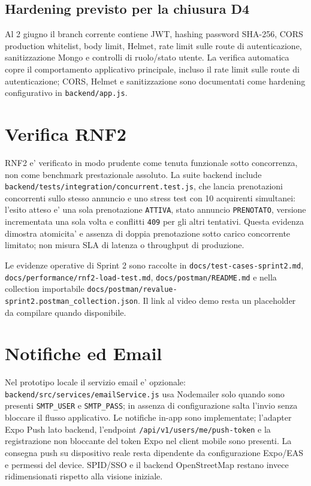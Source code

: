 \documentclass[11pt,a4paper]{article}
\begin{document}
\subsection*{Hardening previsto per la chiusura D4}

Al 2 giugno il branch corrente contiene JWT, hashing password SHA-256, CORS production whitelist, body limit, Helmet, rate limit sulle route di autenticazione, sanitizzazione Mongo e controlli di ruolo/stato utente. La verifica automatica copre il comportamento applicativo principale, incluso il rate limit sulle route di autenticazione; CORS, Helmet e sanitizzazione sono documentati come hardening configurativo in \texttt{backend/app.js}.

\section{Verifica RNF2}

RNF2 e' verificato in modo prudente come tenuta funzionale sotto concorrenza, non come benchmark prestazionale assoluto. La suite backend include \texttt{backend/tests/integration/concurrent.test.js}, che lancia prenotazioni concorrenti sullo stesso annuncio e uno stress test con 10 acquirenti simultanei: l'esito atteso e' una sola prenotazione \texttt{ATTIVA}, stato annuncio \texttt{PRENOTATO}, versione incrementata una sola volta e conflitti \texttt{409} per gli altri tentativi. Questa evidenza dimostra atomicita' e assenza di doppia prenotazione sotto carico concorrente limitato; non misura SLA di latenza o throughput di produzione.

Le evidenze operative di Sprint 2 sono raccolte in \texttt{docs/test-cases-sprint2.md}, \texttt{docs/performance/rnf2-load-test.md}, \texttt{docs/postman/README.md} e nella collection importabile \texttt{docs/postman/revalue-sprint2.postman\_collection.json}. Il link al video demo resta un placeholder da compilare quando disponibile.

\section{Notifiche ed Email}

Nel prototipo locale il servizio email e' opzionale: \texttt{backend/src/services/emailService.js} usa Nodemailer solo quando sono presenti \texttt{SMTP\_USER} e \texttt{SMTP\_PASS}; in assenza di configurazione salta l'invio senza bloccare il flusso applicativo. Le notifiche in-app sono implementate; l'adapter Expo Push lato backend, l'endpoint \texttt{/api/v1/users/me/push-token} e la registrazione non bloccante del token Expo nel client mobile sono presenti. La consegna push su dispositivo reale resta dipendente da configurazione Expo/EAS e permessi del device. SPID/SSO e il backend OpenStreetMap restano invece ridimensionati rispetto alla visione iniziale.
\end{document}
